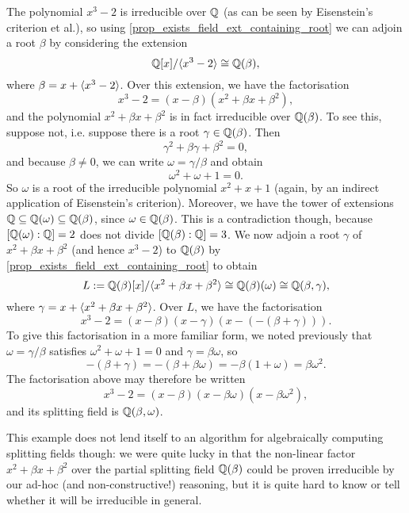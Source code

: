\begin{example}
    The polynomial $x^3 - 2$ is irreducible over $\mathbb{{Q}}$ (as can be seen by Eisenstein's criterion et al.), so using \cref{prop_exists_field_ext_containing_root} we can adjoin a root $\beta$ by considering the extension
    \[
        \mathbb{{Q}}[x]/\langle {x^3 - 2} \rangle \cong \mathbb{{Q}}(\beta),
    \]
    where $\beta = x + \langle {x^3 - 2} \rangle$. Over this extension, we have the factorisation
    \[
        x^3 - 2 = (x - \beta)(x^2 + \beta x + \beta^2),
    \]
    and the polynomial $x^2 + \beta x + \beta^2$ is in fact irreducible over $\mathbb{{Q}}(\beta)$. To see this, suppose not, i.e. suppose there is a root $\gamma \in \mathbb{{Q}}(\beta)$. Then
    \[
        \gamma^2 + \beta \gamma + \beta^2 = 0,
    \]
    and because $\beta \neq 0$, we can write $\omega = \gamma / \beta$ and obtain
    \[
        \omega^2 + \omega + 1 = 0.
    \]
    So $\omega$ is a root of the irreducible polynomial $x^2 + x + 1$ (again, by an indirect application of Eisenstein's criterion). Moreover, we have the tower of extensions $\mathbb{{Q}} \subseteq \mathbb{{Q}}(\omega) \subseteq \mathbb{{Q}}(\beta)$, since $\omega \in \mathbb{{Q}}(\beta)$. This is a contradiction though, because $[\mathbb{{Q}}(\omega) : \mathbb{{Q}}] = 2$ does not divide $[\mathbb{{Q}}(\beta) : \mathbb{{Q}}] = 3$. We now adjoin a root $\gamma$ of $x^2 + \beta x + \beta^2$ (and hence $x^3 - 2$) to $\mathbb{{Q}}(\beta)$ by \cref{prop_exists_field_ext_containing_root} to obtain
    \[
        L := \mathbb{{Q}}(\beta)[x]/\langle {x^2 + \beta x + \beta^2} \rangle \cong \mathbb{{Q}}(\beta)(\omega) \cong \mathbb{{Q}}(\beta, \gamma),
    \]
    where $\gamma = x + \langle {x^2 + \beta x + \beta^2} \rangle$. Over $L$, we have the factorisation
    \[
        x^3 - 2 = (x - \beta)(x - \gamma)(x - (-(\beta + \gamma))).
    \]
    To give this factorisation in a more familiar form, we noted previously that $\omega = \gamma/\beta$ satisfies $\omega^2 + \omega + 1 = 0$ and $\gamma = \beta \omega$, so
    \[
        - (\beta + \gamma) = - (\beta + \beta \omega) = - \beta (1 + \omega) = \beta\omega^2.
    \]
    The factorisation above may therefore be written
    \[
        x^3 - 2 = (x - \beta)(x - \beta \omega)(x - \beta \omega^2),
    \]
    and its splitting field is $\mathbb{{Q}}(\beta, \omega)$.
\end{example}

\begin{remark}
    This example does not lend itself to an algorithm for algebraically computing splitting fields though: we were quite lucky in that the non-linear factor $x^2 + \beta x + \beta^2$ over the partial splitting field $\mathbb{{Q}}(\beta)$ could be proven irreducible by our ad-hoc (and non-constructive!) reasoning, but it is quite hard to know or tell whether it will be irreducible in general.
\end{remark}
